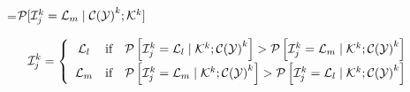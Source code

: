 {\newpage
\clearpage
\samepage \setbox\sizebox=\hbox{${\cal{P}}[{\cal I}_{j}^{k}={\cal L}_m \mid {\cal{C(Y)}}^{k};
{\cal{K}}^{k}]$}\box\sizebox
}

{\newpage
\clearpage
\samepage \begin{displaymath}\hspace*{-0.5cm} \I_j^{k} = \left \{
             \begin{array}{ccl}
             \L_l& \mbox{if} &\P \left [\I_j^{k}
= \L_l \mid \K^{k}; \C^{k} \right ] >
\P \left [\I_j^{k} = \L_m \mid \K^{k}; \C^{k}\right ] \\ [1ex]
             \L_m& \mbox{if} &
\P \left [\I_j^{k} = \L_m \mid \K^{k}; \C^{k} \right ] >
\P\left [\I_j^{k} = \L_l \mid \K^{k}; \C^{k} \right ] \\ 
             \end{array}
             \right .
\label{eq:sum_criteria}
\end{displaymath}
}



